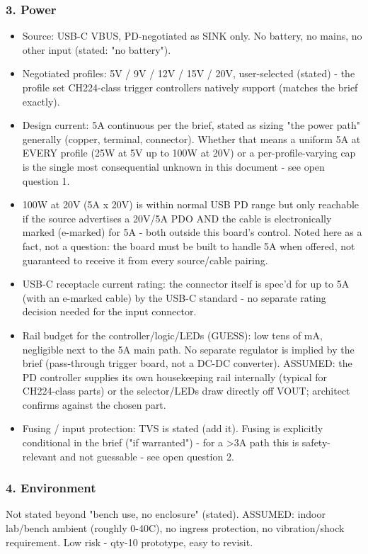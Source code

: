 \documentclass[11pt,a4paper]{article}
\begin{document}
\subsubsection*{3. Power}
\begin{itemize}
\item Source: USB-C VBUS, PD-negotiated as SINK only. No battery, no mains, no
other input (stated: "no battery").
\item Negotiated profiles: 5V / 9V / 12V / 15V / 20V, user-selected (stated) -
the profile set CH224-class trigger controllers natively support
(matches the brief exactly).
\item Design current: 5A continuous per the brief, stated as sizing "the power
path" generally (copper, terminal, connector). Whether that means a
uniform 5A at EVERY profile (25W at 5V up to 100W at 20V) or a
per-profile-varying cap is the single most consequential unknown in this
document - see open question 1.
\item 100W at 20V (5A x 20V) is within normal USB PD range but only reachable
if the source advertises a 20V/5A PDO AND the cable is electronically
marked (e-marked) for 5A - both outside this board's control. Noted here
as a fact, not a question: the board must be built to handle 5A when
offered, not guaranteed to receive it from every source/cable pairing.
\item USB-C receptacle current rating: the connector itself is spec'd for up
to 5A (with an e-marked cable) by the USB-C standard - no separate
rating decision needed for the input connector.
\item Rail budget for the controller/logic/LEDs (GUESS): low tens of mA,
negligible next to the 5A main path. No separate regulator is implied by
the brief (pass-through trigger board, not a DC-DC converter). ASSUMED:
the PD controller supplies its own housekeeping rail internally (typical
for CH224-class parts) or the selector/LEDs draw directly off VOUT;
architect confirms against the chosen part.
\item Fusing / input protection: TVS is stated (add it). Fusing is explicitly
conditional in the brief ("if warranted") - for a \textgreater{}3A path this is
safety-relevant and not guessable - see open question 2.
\end{itemize}
\subsubsection*{4. Environment}
Not stated beyond "bench use, no enclosure" (stated). ASSUMED: indoor lab/bench ambient (roughly 0-40C), no ingress protection, no vibration/shock requirement. Low risk - qty-10 prototype, easy to revisit.
\end{document}
